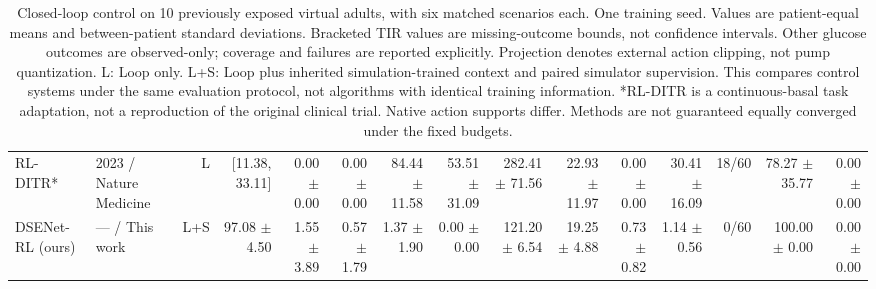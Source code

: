 \begin{table}[t]
{\begin{tabular}{llrrrrrrrrrrrrr}
RL-DITR* & 2023 / Nature Medicine & L & [11.38, 33.11] & 0.00 $\pm$ 0.00 & 0.00 $\pm$ 0.00 & 84.44 $\pm$ 11.58 & 53.51 $\pm$ 31.09 & 282.41 $\pm$ 71.56 & 22.93 $\pm$ 11.97 & 0.00 $\pm$ 0.00 & 30.41 $\pm$ 16.09 & 18/60 & 78.27 $\pm$ 35.77 & 0.00 $\pm$ 0.00 \\
DSENet-RL (ours) & — / This work & L+S & 97.08 $\pm$ 4.50 & 1.55 $\pm$ 3.89 & 0.57 $\pm$ 1.79 & 1.37 $\pm$ 1.90 & 0.00 $\pm$ 0.00 & 121.20 $\pm$ 6.54 & 19.25 $\pm$ 4.88 & 0.73 $\pm$ 0.82 & 1.14 $\pm$ 0.56 & 0/60 & 100.00 $\pm$ 0.00 & 0.00 $\pm$ 0.00 \\
\bottomrule
\end{tabular}}
\caption{Closed-loop control on 10 previously exposed virtual adults, with six matched scenarios each. One training seed. Values are patient-equal means and between-patient standard deviations. Bracketed TIR values are missing-outcome bounds, not confidence intervals. Other glucose outcomes are observed-only; coverage and failures are reported explicitly. Projection denotes external action clipping, not pump quantization. L: Loop only. L+S: Loop plus inherited simulation-trained context and paired simulator supervision. This compares control systems under the same evaluation protocol, not algorithms with identical training information. *RL-DITR is a continuous-basal task adaptation, not a reproduction of the original clinical trial. Native action supports differ. Methods are not guaranteed equally converged under the fixed budgets.}
\label{tab:native-control}
\end{table}
